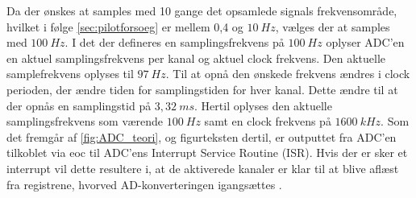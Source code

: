 Da der ønskes at samples med 10 gange det opsamlede signals frekvensområde, hvilket i følge \autoref{sec:pilotforsoeg} er mellem 0,4 og $10~Hz$, vælges der at samples med $100~Hz$. 
I det der defineres en samplingsfrekvens på $100~Hz$ oplyser ADC'en en aktuel samplingsfrekvens per kanal og aktuel clock frekvens. Den aktuelle samplefrekvens oplyses til $97~Hz$. Til at opnå den ønskede frekvens ændres i clock perioden, der ændre tiden for samplingstiden for hver kanal. Dette ændre til at der opnås en  samplingstid på $3,32~ms$. Hertil oplyses den aktuelle samplingsfrekvens som værende $100~Hz$ samt en clock frekvens på $1600~kHz$. 
Som det fremgår af \autoref{fig:ADC_teori}, og figurteksten dertil, er outputtet fra ADC'en tilkoblet via eoc til ADC'ens Interrupt Service Routine (ISR). Hvis der er sker et interrupt vil dette resultere i, at de aktiverede kanaler er klar til at blive aflæst fra registrene, hvorved AD-konverteringen igangsættes \citep{ADC2014}.



